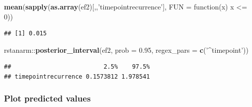 \documentclass[]{article}
\newenvironment{Shaded}{\begin{snugshade}}{\end{snugshade}}
\newcommand{\KeywordTok}[1]{\textcolor[rgb]{0.13,0.29,0.53}{\textbf{{#1}}}}
\newcommand{\DataTypeTok}[1]{\textcolor[rgb]{0.13,0.29,0.53}{{#1}}}
\newcommand{\DecValTok}[1]{\textcolor[rgb]{0.00,0.00,0.81}{{#1}}}
\newcommand{\FloatTok}[1]{\textcolor[rgb]{0.00,0.00,0.81}{{#1}}}
\newcommand{\StringTok}[1]{\textcolor[rgb]{0.31,0.60,0.02}{{#1}}}
\newcommand{\NormalTok}[1]{{#1}}
\begin{document}
\begin{Shaded}
\begin{Highlighting}[]
\KeywordTok{mean}\NormalTok{(}\KeywordTok{sapply}\NormalTok{(}\KeywordTok{as.array}\NormalTok{(ef2)[,,}\StringTok{'timepointrecurrence'}\NormalTok{], }\DataTypeTok{FUN =} \NormalTok{function(x) x <=}\StringTok{ }\DecValTok{0}\NormalTok{))}
\end{Highlighting}
\end{Shaded}

\begin{verbatim}
## [1] 0.015
\end{verbatim}

\begin{Shaded}
\begin{Highlighting}[]
\NormalTok{rstanarm::}\KeywordTok{posterior_interval}\NormalTok{(ef2, }\DataTypeTok{prob =} \FloatTok{0.95}\NormalTok{, }\DataTypeTok{regex_pars =} \KeywordTok{c}\NormalTok{(}\StringTok{'^timepoint'}\NormalTok{))}
\end{Highlighting}
\end{Shaded}

\begin{verbatim}
##                          2.5%    97.5%
## timepointrecurrence 0.1573812 1.978541
\end{verbatim}

\subsubsection{Plot predicted values}\label{plot-predicted-values-1}

\begin{Shaded}
\end{Shaded}
\end{document}
